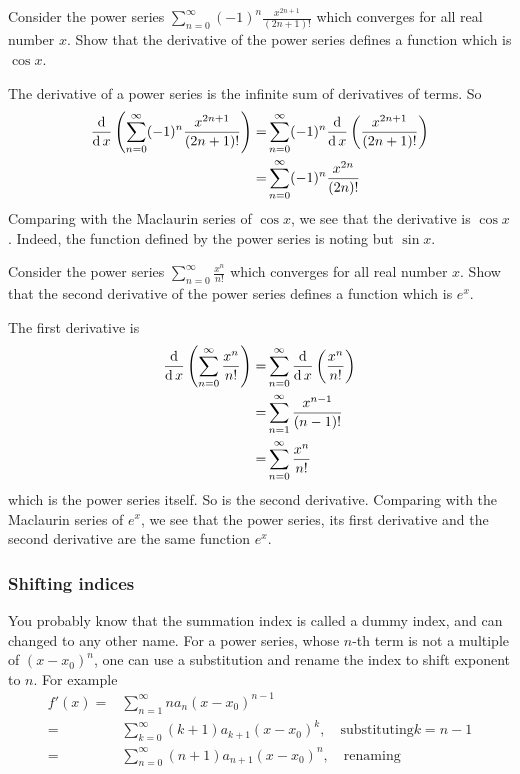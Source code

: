 \begin{example}
Consider the power series 
$\sum_{n=0}^\infty(-1)^n \frac{x^{2n+1}}{(2n+1)!}$
which converges for all real number $x$.
Show that the derivative of the power series defines a function which is $\cos x$.
\end{example}
\begin{solution}
  The derivative of a power series is the infinite sum of derivatives of terms. So
  \[
    \begin{aligned}
      \frac{\operatorname{d}}{\operatorname{d} x}\left(\sum_{n=0}^\infty(-1)^n \frac{x^{2n+1}}{(2n+1)!}\right)
      =&\sum_{n=0}^\infty(-1)^n\frac{\operatorname{d}}{\operatorname{d} x}\left(\frac{x^{2n+1}}{(2n+1)!}\right)\\
      =&\sum_{n=0}^\infty(-1)^n \frac{x^{2n}}{(2n)!}
    \end{aligned}
  \]
  Comparing with the Maclaurin series of $\cos x$, we see that the derivative is $\cos x$. Indeed, the function defined by the power series is noting but $\sin x$.
\end{solution}

\begin{exercise}
  Consider the power series
  $\sum_{n=0}^\infty \frac{x^n}{n!}$
which converges for all real number $x$.
Show that the second derivative of the power series defines a function which is $e^x$.
\end{exercise}
\begin{exersol}
The first derivative is
  \[
    \begin{aligned}
      \frac{\operatorname{d}}{\operatorname{d} x}\left(\sum_{n=0}^\infty\frac{x^n}{n!}\right)=&\sum_{n=0}^\infty\frac{\operatorname{d}}{\operatorname{d} x}\left(\frac{x^n}{n!}\right)\\
      =&\sum_{n=1}^\infty \frac{x^{n-1}}{(n-1)!}\\
      =&\sum_{n=0}^\infty \frac{x^n}{n!}\\
    \end{aligned}
  \]
  which is the power series itself. So is the second derivative.
  Comparing with the Maclaurin series of $e^x$, we see that the power series, its first derivative and the second derivative are the same function $e^x$.
\end{exersol}


\subsubsection*{Shifting indices}

You probably know that the summation index is called a dummy index, and can changed to any other name. For a power series, whose $n$-th term is not a multiple of $(x-x_0)^n$, one can use a substitution and rename the index to shift exponent to $n$. For example
\[
\begin{aligned}
  f'(x)=&\sum\limits_{n=1}^\infty na_n(x-x_0)^{n-1}\\
  =&\sum\limits_{k=0}^\infty (k+1)a_{k+1}(x-x_0)^k,\quad\text{substituting} k=n-1\\
  =&\sum\limits_{n=0}^\infty (n+1)a_{n+1}(x-x_0)^n,\quad\text{renaming}\\
\end{aligned}  
\]

